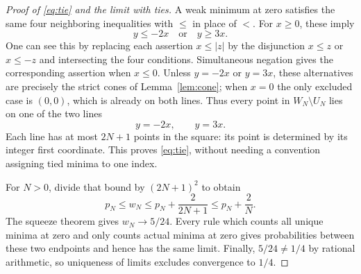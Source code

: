 \documentclass[11pt]{article}
\newcommand{\abs}[1]{\lvert#1\rvert}
\begin{document}
\begin{proof}[Proof of \eqref{eq:tie} and the limit with ties]
A weak minimum at zero satisfies the same four neighboring inequalities with $\le$ in place of $<$. For $x\ge0$, these imply
\[
 y\le-2x\quad\text{or}\quad y\ge3x.
\]
One can see this by replacing each assertion $x\le\abs z$ by the disjunction $x\le z$ or $x\le-z$ and intersecting the four conditions. Simultaneous negation gives the corresponding assertion when $x\le0$. Unless $y=-2x$ or $y=3x$, these alternatives are precisely the strict cones of Lemma~\ref{lem:cone}; when $x=0$ the only excluded case is $(0,0)$, which is already on both lines. Thus every point in $W_N\setminus U_N$ lies on one of the two lines
\[
 y=-2x,\qquad y=3x.
\]
Each line has at most $2N+1$ points in the square: its point is determined by its integer first coordinate. This proves \eqref{eq:tie}, without needing a convention assigning tied minima to one index.

For $N>0$, divide that bound by $(2N+1)^2$ to obtain
\[
 p_N\le w_N\le p_N+\frac{2}{2N+1}\le p_N+\frac2N.
\]
The squeeze theorem gives $w_N\to5/24$. Every rule which counts all unique minima at zero and only counts actual minima at zero gives probabilities between these two endpoints and hence has the same limit. Finally, $5/24\ne1/4$ by rational arithmetic, so uniqueness of limits excludes convergence to $1/4$.
\end{proof}
\end{document}
